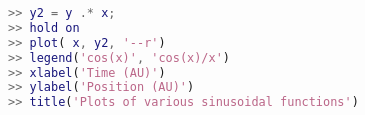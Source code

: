 \begin{lstlisting}[language=matlab]
>> y2 = y .* x;
>> hold on
>> plot( x, y2, '--r')
>> legend('cos(x)', 'cos(x)/x')
>> xlabel('Time (AU)')
>> ylabel('Position (AU)')
>> title('Plots of various sinusoidal functions')

\end{lstlisting}